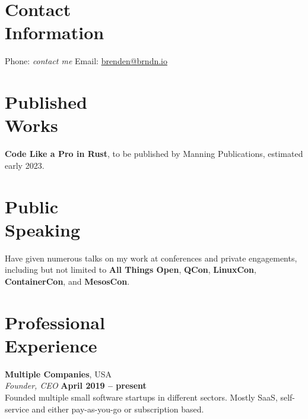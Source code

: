 \documentclass[margin,line]{resume}
\begin{document}
\begin{resume}

    \section{\mysidestyle Contact\\Information}

    Phone: \emph{contact me}                  \hfill
    Email: \href{mailto:brenden@brndn.io}{brenden@brndn.io}                   \hfill

    \vspace{5mm}

    \section{\mysidestyle Published\\Works}

    \textbf{Code Like a Pro in Rust}, to be published by Manning Publications,
    estimated early 2023.

    \vspace{5mm}

    \section{\mysidestyle Public\\Speaking}

    Have given numerous talks on my work at conferences and private engagements,
    including but not limited to \textbf{All Things Open}, \textbf{QCon},
    \textbf{LinuxCon}, \textbf{ContainerCon}, and \textbf{MesosCon}.
    
    \vspace{5mm}

    \section{\mysidestyle Professional\\Experience}

    \textbf{Multiple Companies}, USA \vspace{2mm}\\\vspace{1mm}%
    \textsl{Founder, CEO} \hfill \textbf{April 2019 -- present}\\
    Founded multiple small software startups in different sectors. Mostly SaaS,
    self-service and either pay-as-you-go or subscription based.


\end{resume}
\end{document}
